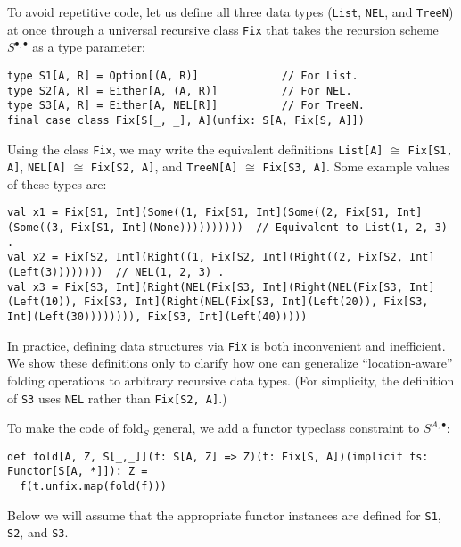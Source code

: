 To avoid repetitive code, let us define all three data types (\lstinline!List!,
\lstinline!NEL!, and \lstinline!TreeN!) at once through a universal
recursive class \lstinline!Fix! that takes the recursion scheme $S^{\bullet,\bullet}$
as a type parameter:
\begin{lstlisting}
type S1[A, R] = Option[(A, R)]             // For List.
type S2[A, R] = Either[A, (A, R)]          // For NEL.
type S3[A, R] = Either[A, NEL[R]]          // For TreeN.
final case class Fix[S[_, _], A](unfix: S[A, Fix[S, A]])
\end{lstlisting}
Using the class \lstinline!Fix!, we may write the equivalent definitions
\lstinline!List[A]! $\cong$ \lstinline!Fix[S1, A]!, \lstinline!NEL[A]!
$\cong$ \lstinline!Fix[S2, A]!, and \lstinline!TreeN[A]! $\cong$
\lstinline!Fix[S3, A]!. Some example values of these types are:
\begin{lstlisting}
val x1 = Fix[S1, Int](Some((1, Fix[S1, Int](Some((2, Fix[S1, Int](Some((3, Fix[S1, Int](None))))))))))  // Equivalent to List(1, 2, 3) .
val x2 = Fix[S2, Int](Right((1, Fix[S2, Int](Right((2, Fix[S2, Int](Left(3))))))))  // NEL(1, 2, 3) .
val x3 = Fix[S3, Int](Right(NEL(Fix[S3, Int](Right(NEL(Fix[S3, Int](Left(10)), Fix[S3, Int](Right(NEL(Fix[S3, Int](Left(20)), Fix[S3, Int](Left(30)))))))), Fix[S3, Int](Left(40)))))
\end{lstlisting}

In practice, defining data structures via \lstinline!Fix! is both
inconvenient and inefficient. We show these definitions only to clarify
how one can generalize \textsf{``}location-aware\textsf{''} folding operations to
arbitrary recursive data types. (For simplicity, the definition of
\lstinline!S3! uses \lstinline!NEL! rather than \lstinline!Fix[S2, A]!.)

To make the code of $\text{fold}_{S}$ general, we add a functor typeclass
constraint to $S^{A,\bullet}$:
\begin{lstlisting}
def fold[A, Z, S[_,_]](f: S[A, Z] => Z)(t: Fix[S, A])(implicit fs: Functor[S[A, *]]): Z =
  f(t.unfix.map(fold(f)))
\end{lstlisting}
Below we will assume that the appropriate functor instances are defined
for \lstinline!S1!, \lstinline!S2!, and \lstinline!S3!.

